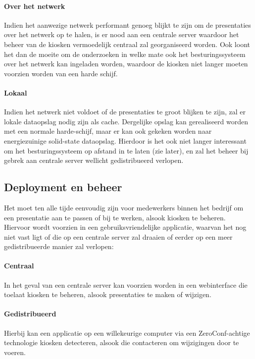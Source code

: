 \documentclass[a4paper,oneside,11pt,final]{memoir}
\begin{document}
\paragraph{Over het netwerk} Indien het aanwezige netwerk performant genoeg blijkt te zijn om de presentaties over het netwerk op te halen, is er nood aan een centrale server waardoor het beheer van de kiosken vermoedelijk centraal zal georganiseerd worden. Ook loont het dan de moeite om de onderzoeken in welke mate ook het besturingssysteem over het netwerk kan ingeladen worden, waardoor de kiosken niet langer moeten voorzien worden van een harde schijf.

\paragraph{Lokaal} Indien het netwerk niet voldoet of de presentaties te groot blijken te zijn, zal er lokale dataopslag nodig zijn als cache. Dergelijke opslag kan gerealiseerd worden met een normale harde-schijf, maar er kan ook gekeken worden naar energiezuinige solid-state dataopslag.
Hierdoor is het ook niet langer interessant om het besturingssysteem op afstand in te laten (zie later), en zal het beheer bij gebrek aan centrale server wellicht gedistribueerd verlopen.

\subsection{Deployment en beheer}

Het moet ten alle tijde eenvoudig zijn voor medewerkers binnen het bedrijf om een presentatie aan te passen of bij te werken, alsook kiosken te beheren. Hiervoor wordt voorzien in een gebruiksvriendelijke applicatie, waarvan het nog niet vast ligt of die op een centrale server zal draaien of eerder op een meer gedistribueerde manier zal verlopen:

\paragraph{Centraal} In het geval van een centrale server kan voorzien worden in een webinterface die toelaat kiosken te beheren, alsook presentaties te maken of wijzigen.

\paragraph{Gedistribueerd} Hierbij kan een applicatie op een willekeurige computer via een ZeroConf-achtige technologie kiosken detecteren, alsook die contacteren om wijzigingen door te voeren.
\end{document}

